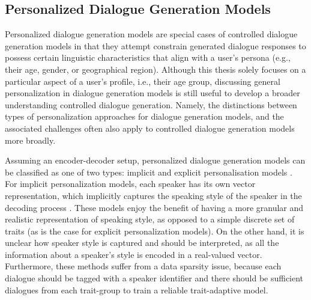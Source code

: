 
\subsection{Personalized Dialogue Generation Models}
Personalized dialogue generation models are special cases of controlled dialogue generation models in that they attempt constrain generated dialogue responses to possess certain linguistic characteristics that align with a user's persona (e.g., their age, gender, or geographical region).
Although this thesis solely focuses on a particular aspect of a user's profile, i.e., their age group, discussing general personalization in dialogue generation models is still useful to develop a broader understanding controlled dialogue generation. Namely, the distinctions between types of personalization approaches for dialogue generation models, and the associated challenges often also apply to controlled dialogue generation models more broadly.

Assuming an encoder-decoder setup, personalized dialogue generation models can be classified as one of two types: implicit and explicit personalisation models \cite{zheng2019personalized}. For implicit personalization models, each speaker has its own vector representation, which implicitly captures the speaking style of the speaker in the decoding process \citep{ijcai2017-521, li-etal-2016-persona}. These models enjoy the benefit of having a more granular and realistic representation of speaking style, as opposed to a simple discrete set of traits (as is the case for explicit personalization models). On the other hand, it is unclear how speaker style is captured and should be interpreted, as all the information about a speaker's style is encoded in a real-valued vector. Furthermore, these methods suffer from a data sparsity issue, because each dialogue should be tagged with a speaker identifier and there should be sufficient dialogues from each trait-group to train a reliable trait-adaptive model. 


